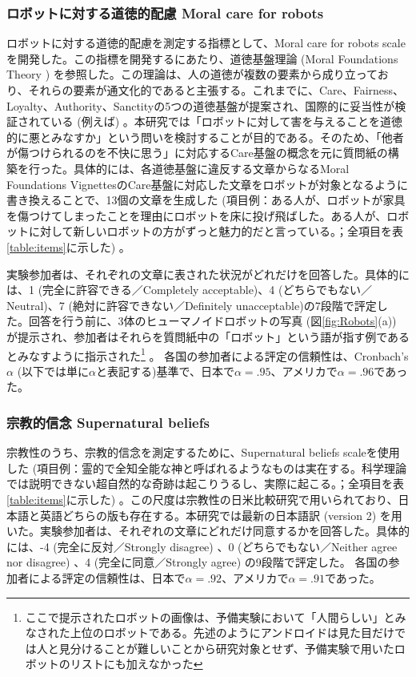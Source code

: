 \documentclass[a4j,12pt]{jreport}
\begin{document}
\subsubsection*{ロボットに対する道徳的配慮 Moral care for robots}


ロボットに対する道徳的配慮を測定する指標として、Moral care for robots scaleを開発した。この指標を開発するにあたり、道徳基盤理論 (Moral Foundations Theory \cite{MFT}) を参照した。この理論は、人の道徳が複数の要素から成り立っており、それらの要素が通文化的であると主張する。これまでに、Care、Fairness、Loyalty、Authority、Sanctityの5つの道徳基盤が提案され、国際的に妥当性が検証されている (例えば\cite{jpmft, frmft}) 。本研究では「ロボットに対して害を与えることを道徳的に悪とみなすか」という問いを検討することが目的である。そのため、「他者が傷つけられるのを不快に思う」に対応するCare基盤の概念を元に質問紙の構築を行った。具体的には、各道徳基盤に違反する文章からなるMoral Foundations Vignettes\cite{clif}のCare基盤に対応した文章をロボットが対象となるように書き換えることで、13個の文章を生成した (項目例：ある人が、ロボットが家具を傷つけてしまったことを理由にロボットを床に投げ飛ばした。ある人が、ロボットに対して新しいロボットの方がずっと魅力的だと言っている。；全項目を表\ref{table:items}に示した) 。


実験参加者は、それぞれの文章に表された状況がどれだけを回答した。具体的には、1 (完全に許容できる／Completely acceptable)、4 (どちらでもない／Neutral)、7 (絶対に許容できない／Definitely unacceptable)の7段階で評定した。回答を行う前に、3体のヒューマノイドロボットの写真 (図\ref{fig:Robots}(a)) が提示され、参加者はそれらを質問紙中の「ロボット」という語が指す例であるとみなすように指示された\footnote{ここで提示されたロボットの画像は、予備実験\cite{ikari}において「人間らしい」とみなされた上位のロボットである。先述のようにアンドロイドは見た目だけでは人と見分けることが難しいことから研究対象とせず、予備実験で用いたロボットのリストにも加えなかった} 。
各国の参加者による評定の信頼性は、Cronbach's $\alpha$ (以下では単に$\alpha$と表記する)基準で、日本で$\alpha=.95$、アメリカで$\alpha=.96$であった。



\subsubsection*{宗教的信念 Supernatural beliefs}
宗教性のうち、宗教的信念を測定するために、Supernatural beliefs scale\cite{sbs}を使用した (項目例：霊的で全知全能な神と呼ばれるようなものは実在する。科学理論では説明できない超自然的な奇跡は起こりうるし、実際に起こる。；全項目を表\ref{table:items}に示した) 。この尺度は宗教性の日米比較研究\cite{kava}で用いられており、日本語と英語どちらの版も存在する。本研究では最新の日本語訳 (version 2) を用いた。実験参加者は、それぞれの文章にどれだけ同意するかを回答した。具体的には、-4 (完全に反対／Strongly disagree) 、0 (どちらでもない／Neither agree nor disagree) 、4 (完全に同意／Strongly agree) の9段階で評定した。
各国の参加者による評定の信頼性は、日本で$\alpha=.92$、アメリカで$\alpha=.91$であった。
\end{document}
